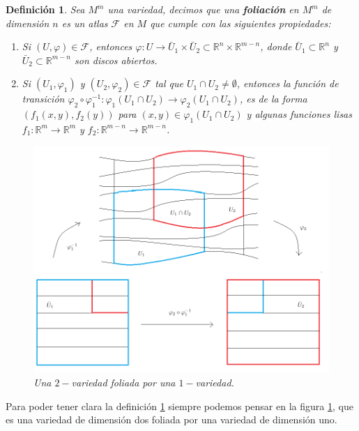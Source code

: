 \documentclass[a4paper,10pt]{book}
\newtheorem{definicion}{Definici\'on}[chapter]
\begin{document}
\begin{definicion}\label{def1}
Sea $M^{m}$ una variedad, decimos que una {\bf foliaci\'on} en $M^{m}$ de dimensi\'on $n$ es un atlas $\mathcal{F}$ en $M$ que cumple con las siguientes propiedades:
\begin{enumerate}
	\item Si $(U,\varphi)\in\mathcal{F}$, entonces $\varphi:U\to \bar{U}_{1}\times \bar{U}_{2}\subset\mathbb{R}^{n}\times\mathbb{R}^{m-n}$, donde $\bar{U}_{1}\subset\mathbb{R}^{n}$ y $\bar{U}_{2}\subset\mathbb{R}^{m-n}$ son discos abiertos.
	\item Si $(U_{1},\varphi_{1})$ y $(U_{2},\varphi_{2})\in\mathcal{F}$ tal que $U_{1}\cap U_{2}\neq \emptyset$, entonces la funci\'on de transici\'on $\varphi_{2}\circ\varphi_{1}^{-1}: \varphi_{1}(U_{1}\cap U_{2})\to\varphi_{2}(U_{1}\cap U_{2})$, es de la forma 	$(f_{1}(x,y),f_{2}(y))$ para $(x,y)\in\varphi_{1}(U_{1}\cap U_{2})$ y algunas funciones lisas $f_{1}:\mathbb{R}^{m}\to\mathbb{R}^{m}$ y $f_{2}:\mathbb{R}^{m-n}\to\mathbb{R}^{m-n}$. 	
\end{enumerate} 
\begin{figure}[!ht]
\centering
\includegraphics[scale=0.5]{foliacion.png}
\caption{Una $2-$variedad foliada por una $1-$variedad.}
\label{foliacion}
\end{figure}
\end{definicion}

Para poder tener clara la definici\'on \ref{def1} siempre podemos pensar en la figura \ref{foliacion}, que es una variedad de dimensi\'on dos foliada por una variedad de dimensi\'on uno.\\
\end{document}
